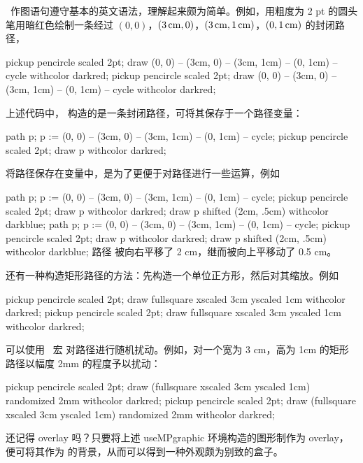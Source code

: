 \MetaPost\ 作图语句遵守基本的英文语法，理解起来颇为简单。例如，用粗度为 2 pt 的圆头笔用暗红色绘制一条经过 $(0, 0)$，$(3\,{\rm cm}, 0)$，$(3\,{\rm cm}, 1\,{\rm cm})$，$(0, 1\,{\rm cm})$ 的封闭路径，

\starttyping[option=MP]
\startMPcode
pickup pencircle scaled 2pt;
draw (0, 0) -- (3cm, 0) -- (3cm, 1cm) -- (0, 1cm) -- cycle withcolor darkred;
\stopMPcode
\stoptyping
\startMPcode
pickup pencircle scaled 2pt;
draw (0, 0) -- (3cm, 0) -- (3cm, 1cm) -- (0, 1cm) -- cycle withcolor darkred;
\stopMPcode

上述代码中， 构造的是一条封闭路径，可将其保存于一个路径变量：

\starttyping[option=MP]
path p;
p := (0, 0) -- (3cm, 0) -- (3cm, 1cm) -- (0, 1cm) -- cycle;
pickup pencircle scaled 2pt;
draw p withcolor darkred;
\stoptyping

将路径保存在变量中，是为了更便于对路径进行一些运算，例如

\starttyping[option=MP]
path p;
p := (0, 0) -- (3cm, 0) -- (3cm, 1cm) -- (0, 1cm) -- cycle;
pickup pencircle scaled 2pt;
draw p withcolor darkred;
draw p shifted (2cm, .5cm) withcolor darkblue;
\stoptyping
\startMPcode
path p;
p := (0, 0) -- (3cm, 0) -- (3cm, 1cm) -- (0, 1cm) -- cycle;
pickup pencircle scaled 2pt;
draw p withcolor darkred;
draw p shifted (2cm, .5cm) withcolor darkblue;
\stopMPcode
\noindent 路径  被向右平移了 2 cm，继而被向上平移动了 0.5 cm。

还有一种构造矩形路径的方法：先构造一个单位正方形，然后对其缩放。例如

\starttyping[option=MP]
pickup pencircle scaled 2pt;
draw fullsquare xscaled 3cm yscaled 1cm withcolor darkred;
\stoptyping
\startMPcode
pickup pencircle scaled 2pt;
draw fullsquare xscaled 3cm yscaled 1cm withcolor darkred;
\stopMPcode

可以使用 \MetaFun\ 宏  对路径进行随机扰动。例如，对一个宽为 3 cm，高为 1cm 的矩形路径以幅度 2mm 的程度予以扰动：

\starttyping[option=MP]
pickup pencircle scaled 2pt;
draw (fullsquare xscaled 3cm yscaled 1cm) randomized 2mm withcolor darkred;
\stopuseMPgraphic
{}
\stoptyping
{}
pickup pencircle scaled 2pt;
draw (fullsquare xscaled 3cm yscaled 1cm) randomized 2mm withcolor darkred;
\stopuseMPgraphic
{}

还记得 overlay 吗？只要将上述 useMPgraphic 环境构造的图形制作为 overlay，便可将其作为 \type{\framed} 的背景，从而可以得到一种外观颇为别致的盒子。

